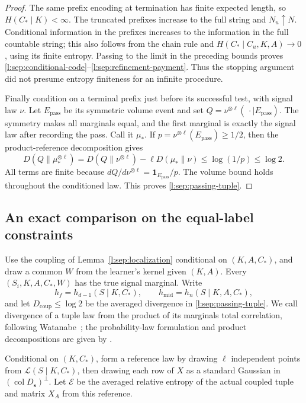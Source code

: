 \begin{proof}
The same prefix encoding at termination has finite expected length,
so \(H(C_*\mid K)<\infty\).  The truncated prefixes increase to the
full string and \(N_u\uparrow N\).  Conditional information in the
prefixes increases to the information in the full countable string;
this also follows from the chain rule and
\(H(C_*\mid C_u,K,A)\to0\), using its finite entropy.
Passing to the limit in the preceding bounds proves
\eqref{l:sep:conditional-code}--\eqref{l:sep:refinement-payment}.
Thus the stopping argument did not presume entropy finiteness for
an infinite procedure.

Finally condition on a terminal prefix just before its successful
test, with signal law \(\nu\).  Let \(E_{\mathrm{pass}}\) be its
symmetric volume event and set
\(Q=\nu^{\otimes\ell}(\,\cdot\mid E_{\mathrm{pass}})\).
The symmetry makes all marginals equal, and the first marginal is
exactly the signal law after recording the pass.  Call it \(\mu_*\).
If \(p=\nu^{\otimes\ell}(E_{\mathrm{pass}})\ge1/2\), then the
product-reference decomposition gives
\[
 D(Q\|\mu_*^{\otimes\ell})
 =D(Q\|\nu^{\otimes\ell})-\ell D(\mu_*\|\nu)
 \le\log(1/p)\le\log2.
\]
All terms are finite because \(dQ/d\nu^{\otimes\ell}
=\mathbf1_{E_{\mathrm{pass}}}/p\).  The volume bound holds throughout
the conditioned law.  This proves \eqref{l:sep:passing-tuple}.
\end{proof}

\subsection{An exact comparison on the equal-label constraints}

Use the coupling of Lemma~\ref{l:sep:localization} conditional on
\((K,A,C_*)\), and draw a common \(W\) from the learner's kernel
given \((K,A)\).  Every \((S_i,K,A,C_*,W)\) has the true signal
marginal.  Write
\[
 h_f=h_{d-1}(S\mid K,C_*),\qquad
 h_{\mathrm{mid}}=h_n(S\mid K,A,C_*),
\]
and let \(D_{\mathrm{coup}}\le\log2\) be the averaged divergence
in \eqref{l:sep:passing-tuple}.  We call divergence of a tuple law
from the product of its marginals total correlation, following
Watanabe~\cite{Watanabe1960}; the probability-law formulation
and product decompositions are given by
\cite[Section~5, Equation~(26) and Proposition~5.1]{Austin2020}.

Conditional on \((K,C_*)\), form a reference law by drawing
\(\ell\) independent points from \(\mathcal L(S\mid K,C_*)\), then
drawing each row of \(X\) as a standard Gaussian in
\((\operatorname{col}D_{\mathbf s})^\perp\).  Let \(\mathcal E\)
be the averaged relative entropy of the actual coupled tuple and
matrix \(X_A\) from this reference.

